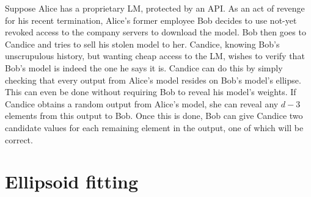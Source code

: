 \documentclass{article}
\begin{document}
Suppose Alice has a proprietary LM, protected by an API.
As an act of revenge for his recent termination,
Alice's former employee Bob decides to use not-yet revoked access to the company servers to download the model.
Bob then goes to Candice and tries to sell his stolen model to her.
Candice, knowing Bob's unscrupulous history, but wanting cheap access to the LM,
wishes to verify that Bob's model is indeed the one he says it is.
Candice can do this by simply checking that every output from Alice's model resides on Bob's model's ellipse. 
This can even be done without requiring Bob to reveal his model's weights.
If Candice obtains a random output from Alice's model, she can reveal any \(d-3\) elements from this output to Bob. Once this is done, Bob can give Candice two candidate values for each remaining element in the output, one of which will be correct.

\begin{figure}
  \centering
  \small
  \hfill
\end{figure}


\section{Ellipsoid fitting}
\end{document}
